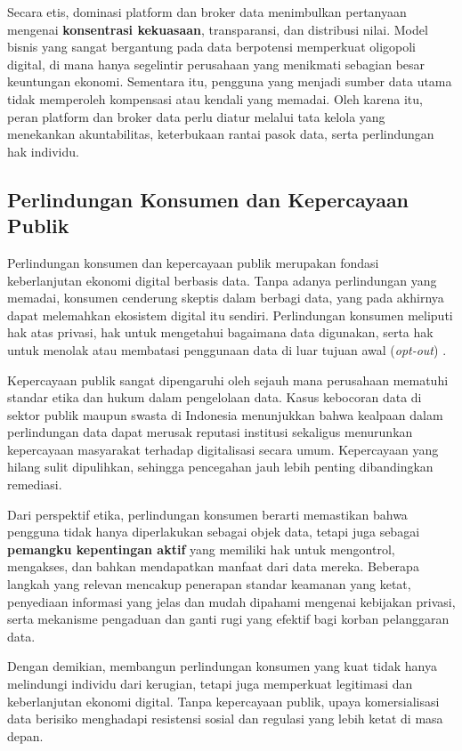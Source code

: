 Secara etis, dominasi platform dan broker data menimbulkan pertanyaan mengenai \textbf{konsentrasi kekuasaan}, transparansi, dan distribusi nilai. Model bisnis yang sangat bergantung pada data berpotensi memperkuat oligopoli digital, di mana hanya segelintir perusahaan yang menikmati sebagian besar keuntungan ekonomi. Sementara itu, pengguna yang menjadi sumber data utama tidak memperoleh kompensasi atau kendali yang memadai. Oleh karena itu, peran platform dan broker data perlu diatur melalui tata kelola yang menekankan akuntabilitas, keterbukaan rantai pasok data, serta perlindungan hak individu.

\subsection{Perlindungan Konsumen dan Kepercayaan Publik}

Perlindungan konsumen dan kepercayaan publik merupakan fondasi keberlanjutan ekonomi digital berbasis data. Tanpa adanya perlindungan yang memadai, konsumen cenderung skeptis dalam berbagi data, yang pada akhirnya dapat melemahkan ekosistem digital itu sendiri. Perlindungan konsumen meliputi hak atas privasi, hak untuk mengetahui bagaimana data digunakan, serta hak untuk menolak atau membatasi penggunaan data di luar tujuan awal (\textit{opt-out}) \cite{solove2006privacy}.  

Kepercayaan publik sangat dipengaruhi oleh sejauh mana perusahaan mematuhi standar etika dan hukum dalam pengelolaan data. Kasus kebocoran data di sektor publik maupun swasta di Indonesia menunjukkan bahwa kealpaan dalam perlindungan data dapat merusak reputasi institusi sekaligus menurunkan kepercayaan masyarakat terhadap digitalisasi secara umum. Kepercayaan yang hilang sulit dipulihkan, sehingga pencegahan jauh lebih penting dibandingkan remediasi.  

Dari perspektif etika, perlindungan konsumen berarti memastikan bahwa pengguna tidak hanya diperlakukan sebagai objek data, tetapi juga sebagai \textbf{pemangku kepentingan aktif} yang memiliki hak untuk mengontrol, mengakses, dan bahkan mendapatkan manfaat dari data mereka. Beberapa langkah yang relevan mencakup penerapan standar keamanan yang ketat, penyediaan informasi yang jelas dan mudah dipahami mengenai kebijakan privasi, serta mekanisme pengaduan dan ganti rugi yang efektif bagi korban pelanggaran data.  

Dengan demikian, membangun perlindungan konsumen yang kuat tidak hanya melindungi individu dari kerugian, tetapi juga memperkuat legitimasi dan keberlanjutan ekonomi digital. Tanpa kepercayaan publik, upaya komersialisasi data berisiko menghadapi resistensi sosial dan regulasi yang lebih ketat di masa depan.


